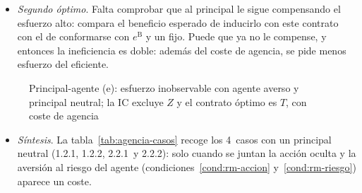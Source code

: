 \documentclass[11pt]{article}
\begin{document}
\begin{itemize}
\begin{itemize}
  \begin{equation}
  \pi(e^{\mathrm{A}})\,w_{\mathrm{E}}+\bigl[1-\pi(e^{\mathrm{A}})\bigr]\,w_{\mathrm{F}}\;>\;w^* , \label{eq:coste-agencia}
  \end{equation}
  por la desigualdad de  ($u^{-1}$ es convexa). La diferencia es la  que paga el principal: el coste de que el esfuerzo no se vea.
  \item \emph{Segundo óptimo}. Falta comprobar que al principal le sigue compensando el esfuerzo alto: compara el beneficio esperado de inducirlo con este contrato con el de conformarse con $e^{\mathrm{B}}$ y un fijo. Puede que ya no le compense, y entonces la ineficiencia es doble: además del coste de agencia, se pide menos esfuerzo del eficiente.
  \end{itemize}
\end{itemize}

\begin{figure}[H]
\centering
\caption{Principal-agente (e): esfuerzo inobservable con agente averso y principal neutral; la IC excluye $Z$ y el contrato óptimo es $T$, con coste de agencia}\label{fig:principal-agente}
\end{figure}

\begin{itemize}
\item \emph{Síntesis}. La tabla~\ref{tab:agencia-casos} recoge los 4~casos con un principal neutral (1.2.1, 1.2.2, 2.2.1~y 2.2.2): solo cuando se juntan la acción oculta y la aversión al riesgo del agente (condiciones~\ref{cond:rm-accion} y~\ref{cond:rm-riesgo}) aparece un coste.
\end{itemize}
\end{document}
